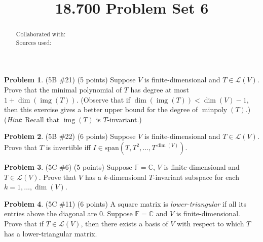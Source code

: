 \documentclass[reqno, 12pt]{amsart}
\theoremstyle{definition}
\newenvironment{problab}[1]
{\noindent\textbf{Problem #1}.}
{\vskip 6pt}
\theoremstyle{remark}
\newtheorem*{soln}{Solution}
\newcommand{\C}{\mathbb C}
\newcommand{\F}{\mathbb F}
\renewcommand{\L}{\mathcal L}
\newcommand{\SSpan}{\text{span}}
\DeclareMathOperator{\img}{img}
\DeclareMathOperator{\minpoly}{minpoly}
\renewcommand{\abstractname}{}    %
\begin{document}

\title{18.700 Problem Set 6}

\maketitle

\begin{abstract}
  \noindent Collaborated with:\\
  Sources used: 
\end{abstract}
\vskip 0.5cm


\begin{problab}{1} (5B \#21) (5 points)
  Suppose $V$ is finite-dimensional and $T \in \L(V)$. Prove that the minimal polynomial of $T$ has degree at most $1 + \dim(\img(T))$. (Observe that if $\dim(\img(T)) < \dim(V) - 1$, then this exercise gives a better upper bound for the degree of $\minpoly(T)$.) (\textit{Hint}: Recall that $\img(T)$ is $T$-invariant.)
\end{problab}


\begin{problab}{2} (5B \#22) (6 points)
  Suppose $V$ is finite-dimensional and $T \in \L(V)$. Prove that $T$ is invertible iff $I \in \SSpan(T, T^2, \ldots, T^{\dim(V)})$.
\end{problab}

\begin{problab}{3} (5C \#6) (5 points)
  Suppose $\F = \C$, $V$ is finite-dimensional and $T \in \L(V)$. Prove that $V$ has a $k$-dimensional $T$-invariant subspace for each $k = 1, \ldots, \dim(V)$.
\end{problab}

\begin{problab}{4} (5C \#11) (6 points)
  A square matrix is \textit{lower-triangular} if all its entries above the diagonal are $0$. Suppose $\F = \C$ and $V$ is finite-dimensional. Prove that if $T \in \L(V)$, then there exists a basis of $V$ with respect to which $T$ has a lower-triangular matrix.
\end{problab}
\end{document}

